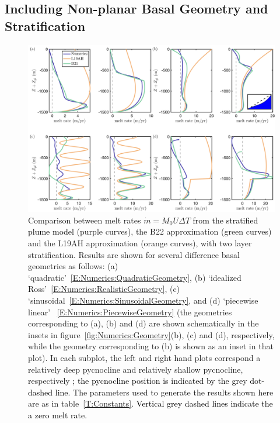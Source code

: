 \documentclass[openacc]{rsproca_new}%
\newcommand{\red}[1]{{\color{red} #1}}
\newcommand{\blue}[1]{{\color{blue} #1}}
\newcommand{\rout}[1]{\red{\st{#1}}}\newcommand{\ab}[1]{\textcolor{Green}{#1}}\newcommand{\about}[1]{\textcolor{Cyan}{\sout{#1}}}
\renewcommand{\rout}[1]{{}} %
\renewcommand{\blue}[1]{{\textcolor{black}{#1}}} %
\renewcommand{\red}[1]{{}} %
\begin{document}
\subsection{Including Non-planar Basal Geometry and Stratification}
\begin{figure}
\centering
\includegraphics[width = \textwidth]{./make_plots/plots/figure8.png}
\caption{Comparison between \rout{numerically obtained }melt rates $\dot{m}= M_0 U \Delta T$ \blue{from the stratified plume model} (purple curves), the B22 approximation (green curves) and the L19AH approximation (orange curves), with two layer stratification. Results are shown for several difference basal geometries as follows: (a) `quadratic'~\eqref{E:Numerics:QuadraticGeometry}, (b) `idealized Ross'~\eqref{E:Numerics:RealisticGeometry}, (c) `sinusoidal~\eqref{E:Numerics:SinusoidalGeometry}, and (d) `piecewise linear' ~\eqref{E:Numerics:PiecewiseGeometry} (the geometries corresponding to (a), (b) and (d) are shown schematically in the insets in figure~\ref{fig:Numerics:Geometry}(b), (c) and (d), respectively, while the geometry corresponding to (b) is shown as an inset in that plot). In each subplot, the left and right hand plots correspond a relatively deep pycnocline and relatively shallow pycnocline, respectively \blue{; the pycnocline position is indicated by the grey dot-dashed line}. The parameters used to generate the results shown here are as in table~\ref{T:Constants}. \blue{Vertical grey dashed lines indicate the a zero melt rate.} }\label{fig:Numerics:pycnocline_and_geometry_idealized}
\end{figure}
\end{document}
